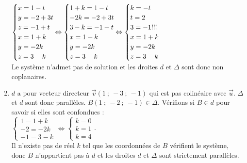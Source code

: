 \documentclass{cornouaille}
\begin{document}
\begin{solution}
\begin{enumerate}
  \hspace*{-5mm}$\begin{cases}
    x=1-t\\y=-2+3t\\z=-1+t\\x=1+k\\y=-2k\\z=3-k \end{cases}\hspace{-4mm}\Leftrightarrow \begin{cases}
    1+k=1-t\\-2k=-2+3t\\3-k=-1+t\\x=1+k\\y=-2k\\z=3-k \end{cases}\hspace{-4mm}\Leftrightarrow
  \begin{cases} k=-t\\t=2\\3=-1
    !!!\\x=1+k\\y=-2k\\z=3-k \end{cases}$\\
  Le système n'admet pas de solution et les droites $d$ et $\Delta$
  sont donc non coplanaires.
\item $d$ a pour vecteur directeur
  $\overrightarrow{v}(1\ ;\ -3\ ;\ -1)$ qui est pas colinéaire avec
  $\overrightarrow{u}$. $\Delta$ et $d$ sont donc parallèles.
  $B(1\ ;\ -2\ ;\ -1)\in\Delta$. Vérifions si $B\in d$ pour savoir si elles sont confondues :\\
  $\begin{cases} 1=1+k\\-2=-2k\\-1=3-k \end{cases}\Leftrightarrow \begin{cases} k=0\\k=1\\k=4 \end{cases}$.\\
  Il n'existe pas de réel $k$ tel que les coordonnées de $B$ vérifient
  le système, donc $B$ n'appartient pas à $d$ et les droites $d$ et
  $\Delta$ sont strictement parallèles.
 \end{enumerate}
\end{solution}

%
\end{document}
